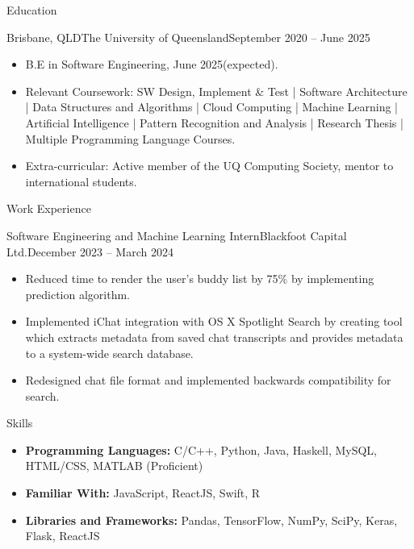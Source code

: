 \documentclass[]{mcdowellcv}
\begin{document}
	\makeheader
	
	\begin{cvsection}{Education}
		\begin{cvsubsection}{Brisbane, QLD}{The University of Queensland}{September 2020 -- June 2025}
			\begin{itemize}
				\item B.E in Software Engineering, June 2025(expected).  
				\item Relevant Coursework: SW Design, Implement & Test | Software Architecture | Data Structures and Algorithms | Cloud Computing | Machine Learning | Artificial Intelligence | Pattern Recognition and Analysis | Research Thesis | Multiple Programming Language Courses.
				\item Extra-curricular: Active member of the UQ Computing Society, mentor to international students.
			\end{itemize}
		\end{cvsubsection}
	\end{cvsection}

	\begin{cvsection}{Work Experience}
		\begin{cvsubsection}{Software Engineering and Machine Learning Intern}{Blackfoot Capital Ltd.}{December 2023 -- March 2024}			
			\begin{itemize}
				\item Reduced time to render the user’s buddy list by 75\% by implementing prediction algorithm.
				\item Implemented iChat integration with OS X Spotlight Search by creating tool which extracts metadata from saved chat transcripts and provides metadata to a system-wide search database.
				\item Redesigned chat file format and implemented backwards compatibility for search.
			\end{itemize}
		\end{cvsubsection}
	\end{cvsection}
	
	
	
	
	\begin{cvsection}{Skills}
		\begin{cvsubsection}{}{}{}	
			\begin{itemize}
				\item \textbf{Programming Languages:} C/C++, Python, Java, Haskell, MySQL, HTML/CSS, MATLAB (Proficient)
				\item \textbf{Familiar With:} JavaScript, ReactJS, Swift, R
			\end{itemize}
		\end{cvsubsection}
		
		\begin{cvsubsection}{}{}{}
			\begin{itemize}
				\item \textbf{Libraries and Frameworks:} Pandas, TensorFlow, NumPy, SciPy, Keras, Flask, ReactJS
			\end{itemize}
		\end{cvsubsection}
	\end{cvsection}
	
\end{document}
